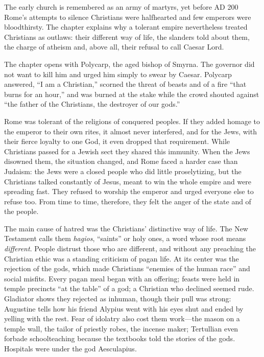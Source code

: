 
\begin{inbrief}
The early church is remembered as an army of martyrs, yet before AD 200 Rome's attempts to silence
Christians were halfhearted and few emperors were bloodthirsty. The chapter explains why a tolerant
empire nevertheless treated Christians as outlaws: their different way of life, the slanders told
about them, the charge of atheism and, above all, their refusal to call Caesar Lord.
\end{inbrief}

The chapter opens with Polycarp, the aged bishop of Smyrna. The governor did not want to kill him and
urged him simply to swear by Caesar. Polycarp answered, ``I am a Christian,'' scorned the threat of
beasts and of a fire ``that burns for an hour,'' and was burned at the stake while the crowd shouted
against ``the father of the Christians, the destroyer of our gods.''

Rome was tolerant of the religions of conquered peoples. If they added homage to the emperor to their
own rites, it almost never interfered, and for the Jews, with their fierce loyalty to one God, it even
dropped that requirement. While Christians passed for a Jewish sect they shared this immunity. When the
Jews disowned them, the situation changed, and Rome faced a harder case than Judaism: the Jews were a
closed people who did little proselytizing, but the Christians talked constantly of Jesus, meant to win
the whole empire and were spreading fast. They refused to worship the emperor and urged everyone else
to refuse too. From time to time, therefore, they felt the anger of the state and of the people.

The main cause of hatred was the Christians' distinctive way of life. The New Testament calls them
\emph{hagios}, ``saints'' or holy ones, a word whose root means \emph{different}. People distrust those
who are different, and without any preaching the Christian ethic was a standing criticism of pagan
life. At its center was the rejection of the gods, which made Christians ``enemies of the human race''
and social misfits. Every pagan meal began with an offering; feasts were held in temple precincts ``at
the table'' of a god; a Christian who declined seemed rude. Gladiator shows they rejected as inhuman,
though their pull was strong: Augustine tells how his friend Alypius went with his eyes shut and ended
by yelling with the rest. Fear of idolatry also cost them work---the mason on a temple wall, the
tailor of priestly robes, the incense maker; Tertullian even forbade schoolteaching because the
textbooks told the stories of the gods. Hospitals were under the god Aesculapius.

